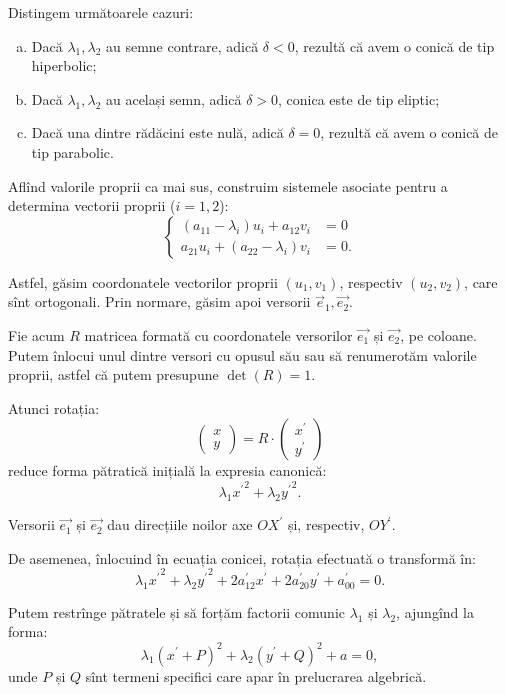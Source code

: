 \documentclass[11pt,a4paper]{article}
\theoremstyle{dotless}
\theoremstyle{dotlessdr}
\begin{document}
Distingem următoarele cazuri:
\begin{enumerate}[(a)]
	\item Dacă $\lambda_1, \lambda_2$ au semne contrare, adică $\delta < 0$,
rezultă că avem o conică de tip hiperbolic;
    \item Dacă $\lambda_1, \lambda_2$ au același semn, adică $\delta > 0$,
conica este de tip eliptic;
    \item Dacă una dintre rădăcini este nulă, adică $\delta = 0$, rezultă că
avem o conică de tip parabolic.
\end{enumerate}

Aflînd valorile proprii ca mai sus, construim sistemele asociate pentru a 
determina vectorii proprii ($i = 1, 2$): 
 \[
	\begin{cases}	
	    (a_{11} - \lambda_i) u_i + a_{12} v_i &= 0 \\
	    a_{21} u_i + (a_{22} - \lambda_i) v_i &= 0.
    \end{cases}
\]

Astfel, găsim coordonatele vectorilor proprii $(u_1, v_1)$, respectiv 
$(u_2, v_2)$, care sînt ortogonali. Prin normare, găsim apoi versorii
$\vec{e}_1, \vec{e_2}$.

Fie acum $R$ matricea formată cu coordonatele versorilor $\vec{e_1}$ și 
$\vec{e_2}$, pe coloane. Putem înlocui unul dintre versori cu opusul său sau
să renumerotăm valorile proprii, astfel că putem presupune $\det(R) = 1$.

Atunci rotația: 
 \[
	\begin{pmatrix}
	    x \\
	    y
    \end{pmatrix} = R \cdot \begin{pmatrix}
	                            x^{\prime} \\
	                            y^{\prime}
                            \end{pmatrix}
\]
reduce forma pătratică inițială la expresia canonică: 
 \[
	\lambda_1 {x^{\prime}}^2 + \lambda_2 {y^{\prime}}^2.
\]

Versorii $\vec{e_1}$ și $\vec{e_2}$ dau direcțiile noilor axe $OX^{\prime}$ și,
respectiv, $OY^{\prime}$.

De asemenea, înlocuind în ecuația conicei, rotația efectuată o transformă în: 
 \[
	\lambda_1 {x^{\prime}}^2 + \lambda_2 {y^{\prime}}^2 + 
	2a_{12}^{\prime} x^{\prime} + 2a^{\prime}_{20} y^{\prime} +
	a_{00}^{\prime} = 0.
\]

Putem restrînge pătratele și să forțăm factorii comunic $\lambda_1$ și 
$\lambda_2$, ajungînd la forma: 
 \[
	\lambda_1 (x^{\prime} + P)^2 + \lambda_2(y^{\prime} + Q)^2 + a = 0,
\]
unde $P$ și $Q$ sînt termeni specifici care apar în prelucrarea algebrică.
\end{document}
